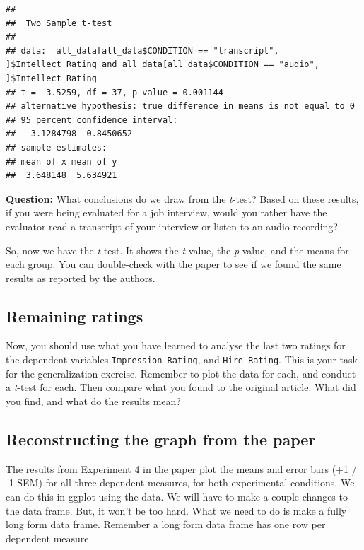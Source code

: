 \documentclass[
]{book}
\begin{document}
\begin{verbatim}
## 
##  Two Sample t-test
## 
## data:  all_data[all_data$CONDITION == "transcript", ]$Intellect_Rating and all_data[all_data$CONDITION == "audio", ]$Intellect_Rating
## t = -3.5259, df = 37, p-value = 0.001144
## alternative hypothesis: true difference in means is not equal to 0
## 95 percent confidence interval:
##  -3.1284798 -0.8450652
## sample estimates:
## mean of x mean of y 
##  3.648148  5.634921
\end{verbatim}

\textbf{Question:} What conclusions do we draw from the \emph{t}-test? Based on these results, if you were being evaluated for a job interview, would you rather have the evaluator read a transcript of your interview or listen to an audio recording?

So, now we have the \emph{t}-test. It shows the \emph{t}-value, the \emph{p}-value, and the means for each group. You can double-check with the paper to see if we found the same results as reported by the authors.

\hypertarget{remaining-ratings}{%
\subsection{Remaining ratings}\label{remaining-ratings}}

Now, you should use what you have learned to analyse the last two ratings for the dependent variables \texttt{Impression\_Rating}, and \texttt{Hire\_Rating}. This is your task for the generalization exercise. Remember to plot the data for each, and conduct a \emph{t}-test for each. Then compare what you found to the original article. What did you find, and what do the results mean?

\hypertarget{reconstructing-the-graph-from-the-paper}{%
\subsection{Reconstructing the graph from the paper}\label{reconstructing-the-graph-from-the-paper}}

The results from Experiment 4 in the paper plot the means and error bars (+1 / -1 SEM) for all three dependent measures, for both experimental conditions. We can do this in ggplot using the data. We will have to make a couple changes to the data frame. But, it won't be too hard. What we need to do is make a fully long form data frame. Remember a long form data frame has one row per dependent measure.
\end{document}
